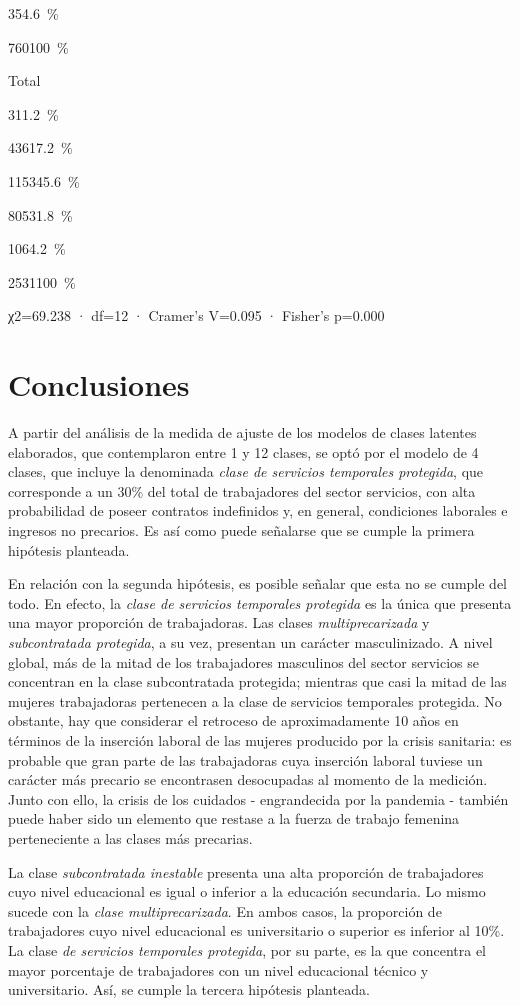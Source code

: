\documentclass[
]{article}
\begin{document}
{35}{4.6~\%}

{760}{100~\%}

Total

{31}{1.2~\%}

{436}{17.2~\%}

{1153}{45.6~\%}

{805}{31.8~\%}

{106}{4.2~\%}

{2531}{100~\%}

χ2=69.238 · df=12 · Cramer's V=0.095 · Fisher's p=0.000

\hypertarget{conclusiones}{%
\section{Conclusiones}\label{conclusiones}}

A partir del análisis de la medida de ajuste de los modelos de clases
latentes elaborados, que contemplaron entre 1 y 12 clases, se optó por
el modelo de 4 clases, que incluye la denominada \emph{clase de
servicios temporales protegida}, que corresponde a un 30\% del total de
trabajadores del sector servicios, con alta probabilidad de poseer
contratos indefinidos y, en general, condiciones laborales e ingresos no
precarios. Es así como puede señalarse que se cumple la primera
hipótesis planteada.

En relación con la segunda hipótesis, es posible señalar que esta no se
cumple del todo. En efecto, la \emph{clase de servicios temporales
protegida} es la única que presenta una mayor proporción de
trabajadoras. Las clases \emph{multiprecarizada} y \emph{subcontratada
protegida}, a su vez, presentan un carácter masculinizado. A nivel
global, más de la mitad de los trabajadores masculinos del sector
servicios se concentran en la clase subcontratada protegida; mientras
que casi la mitad de las mujeres trabajadoras pertenecen a la clase de
servicios temporales protegida. No obstante, hay que considerar el
retroceso de aproximadamente 10 años en términos de la inserción laboral
de las mujeres producido por la crisis sanitaria: es probable que gran
parte de las trabajadoras cuya inserción laboral tuviese un carácter más
precario se encontrasen desocupadas al momento de la medición. Junto con
ello, la crisis de los cuidados - engrandecida por la pandemia - también
puede haber sido un elemento que restase a la fuerza de trabajo femenina
perteneciente a las clases más precarias.

La clase \emph{subcontratada inestable} presenta una alta proporción de
trabajadores cuyo nivel educacional es igual o inferior a la educación
secundaria. Lo mismo sucede con la \emph{clase multiprecarizada}. En
ambos casos, la proporción de trabajadores cuyo nivel educacional es
universitario o superior es inferior al 10\%. La clase \emph{de
servicios temporales protegida}, por su parte, es la que concentra el
mayor porcentaje de trabajadores con un nivel educacional técnico y
universitario. Así, se cumple la tercera hipótesis planteada.
\end{document}
